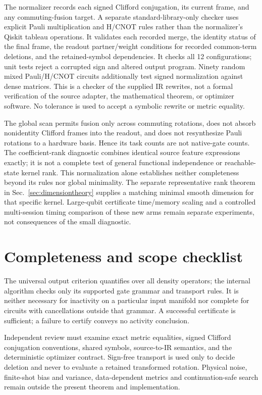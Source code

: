 The normalizer records each signed Clifford conjugation, its current
frame, and any commuting-fusion target. A separate standard-library-only
checker uses explicit Pauli multiplication and H/CNOT rules rather than
the normalizer's Qiskit tableau operations. It validates each recorded
merge, the identity status of the final frame, the readout partner/weight
conditions for recorded common-term deletions, and the retained-symbol
dependencies. It checks all 12 configurations; unit tests reject a
corrupted sign and altered output program. Ninety random mixed Pauli/H/CNOT
circuits additionally test signed normalization against dense matrices.
This is a checker of the supplied IR rewrites, not a formal verification
of the source adapter, the mathematical theorem, or optimizer software.
No tolerance is used to accept a symbolic rewrite or metric equality.

The global scan permits fusion only across commuting rotations, does
not absorb nonidentity Clifford frames into the readout, and does not
resynthesize Pauli rotations to a hardware basis. Hence its task counts
are not native-gate counts. The coefficient-rank diagnostic combines
identical source feature expressions exactly; it is not a complete
test of general functional independence or reachable-state kernel rank.
This normalization alone establishes neither completeness beyond its
rules nor global minimality. The separate representative rank theorem
in Sec.~\ref{sec:dimensiontheory} supplies a matching minimal smooth
dimension for that specific kernel. Large-qubit certificate time/memory scaling and
a controlled multi-session timing comparison of these new arms remain
separate experiments, not consequences of the small diagnostic.

\section{Completeness and scope checklist}
The universal output criterion quantifies over all density operators;
the internal algorithm checks only its supported gate grammar and
transport rules. It is neither necessary for inactivity on a particular
input manifold nor complete for circuits with cancellations outside
that grammar. A successful certificate is sufficient; a failure to
certify conveys no activity conclusion.

Independent review must examine exact metric equalities, signed
Clifford conjugation conventions, shared symbols, source-to-IR
semantics, and the deterministic optimizer contract. Sign-free
transport is used only to decide deletion and never to evaluate a
retained transformed rotation. Physical noise, finite-shot bias and
variance, data-dependent metrics and continuation-safe search remain
outside the present theorem and implementation.
